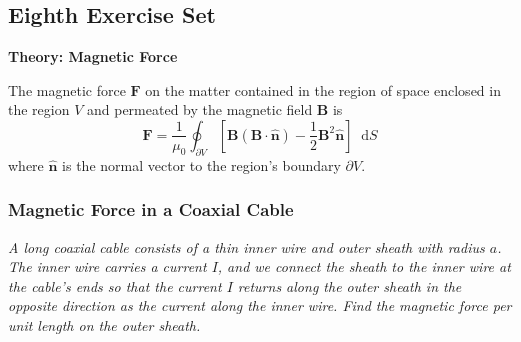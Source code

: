 \documentclass[11pt, a4paper]{article}
\newcommand{\diff}{\mathop{}\!\mathrm{d}} %
\renewcommand{\vec}[1]{\bm{#1}} %
\newcommand{\uvec}[1]{\hat{\vec{#1}}} %
\newcommand{\B}{\vec{B}} %
\begin{document}
\begin{itemize}
\end{itemize}

\subsection{Eighth Exercise Set}

\textbf{Theory: Magnetic Force}\vspace{2mm}

The magnetic force $ \vec{F} $ on the matter contained in the region of space enclosed in the region $ V $ and permeated by the magnetic field $ \B $ is
\begin{equation*}
	\vec{F} = \frac{1}{\mu_{0}}\oint_{\partial V}\left [\B(\B \cdot \uvec{n}) - \frac{1}{2}\B^{2}\uvec{n}\right ] \diff S
\end{equation*}
where $ \uvec{n} $ is the normal vector to the region's boundary $ \partial V $.

\subsubsection{Magnetic Force in a Coaxial Cable}
\textit{A long coaxial cable consists of a thin inner wire and outer sheath with radius $ a $. The inner wire carries a current $ I $, and we connect the sheath to the inner wire at the cable's ends so that the current $ I $ returns along the outer sheath in the opposite direction as the current along the inner wire. Find the magnetic force per unit length on the outer sheath.}
\end{document}
